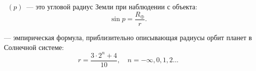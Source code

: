 ~$(p)$~--- это угловой радиус Земли при наблюдении с объекта:
\begin{equation}
	\sin p=\frac{R_\oplus}{r}.
\end{equation}

 --- эмпирическая формула, приблизительно описывающая
радиусы орбит планет в Солнечной системе:
\begin{equation}r=\frac{3\cdot 2^n+4}{10}, \quad n=-\infty, 0, 1, 2...
\end{equation}

